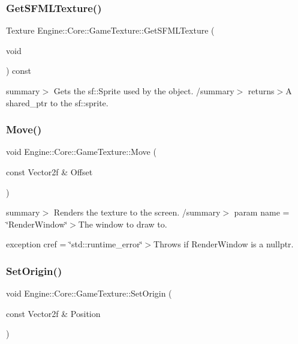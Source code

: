 \subsubsection{\texorpdfstring{Get\+S\+F\+M\+L\+Texture()}{GetSFMLTexture()}}
{\footnotesize\ttfamily Texture Engine\+::\+Core\+::\+Game\+Texture\+::\+Get\+S\+F\+M\+L\+Texture (\begin{DoxyParamCaption}\item[{void}]{ }\end{DoxyParamCaption}) const}

summary$>$ Gets the sf\+::\+Sprite used by the object. /summary$>$ returns$>$A shared\+\_\+ptr to the sf\+::sprite.\mbox{\label{class_engine_1_1_core_1_1_game_texture_af0169ac026c5b15cb3195d1199b13d33}} 
\subsubsection{\texorpdfstring{Move()}{Move()}}
{\footnotesize\ttfamily void Engine\+::\+Core\+::\+Game\+Texture\+::\+Move (\begin{DoxyParamCaption}\item[{const Vector2f \&}]{Offset }\end{DoxyParamCaption})}

summary$>$ Renders the texture to the screen. /summary$>$ param name = \char`\"{}\+Render\+Window\char`\"{}$>$The window to draw to.

exception cref = \char`\"{}std\+::runtime\+\_\+error\char`\"{}$>$Throws if Render\+Window is a nullptr.\mbox{\label{class_engine_1_1_core_1_1_game_texture_aa01df5d689abf48b1d442da329485eeb}} 
\subsubsection{\texorpdfstring{Set\+Origin()}{SetOrigin()}}
{\footnotesize\ttfamily void Engine\+::\+Core\+::\+Game\+Texture\+::\+Set\+Origin (\begin{DoxyParamCaption}\item[{const Vector2f \&}]{Position }\end{DoxyParamCaption})}

